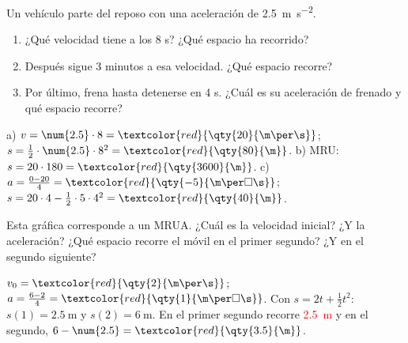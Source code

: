 \begin{exercise}
    Un vehículo parte del reposo con una aceleración de \qty{2.5}{\m\per\square\s}.
    \begin{enumerate}[label=\alph*)]
        \item ¿Qué velocidad tiene a los 8 s? ¿Qué espacio ha recorrido?
        \item Después sigue 3 minutos a esa velocidad. ¿Qué espacio recorre?
        \item Por último, frena hasta detenerse en 4 s. ¿Cuál es su aceleración de frenado y qué espacio recorre?
    \end{enumerate}
    \begin{solu}
        a) \(v = \num{2.5} \cdot 8 = \textcolor{red}{\qty{20}{\m\per\s}}\); \(s = \frac{1}{2} \cdot \num{2.5} \cdot 8^2 = \textcolor{red}{\qty{80}{\m}}\).
        b) MRU: \(s = 20 \cdot 180 = \textcolor{red}{\qty{3600}{\m}}\).
        c) \(a = \frac{0 - 20}{4} = \textcolor{red}{\qty{-5}{\m\per\square\s}}\); \(s = 20 \cdot 4 - \frac{1}{2} \cdot 5 \cdot 4^2 = \textcolor{red}{\qty{40}{\m}}\).
    \end{solu}
\end{exercise}

\begin{exercise}
    Esta gráfica corresponde a un MRUA. ¿Cuál es la velocidad inicial? ¿Y la aceleración? ¿Qué espacio recorre el móvil en el primer segundo? ¿Y en el segundo siguiente?
    \begin{center}
    \end{center}
    \begin{solu}
        \(v_0 = \textcolor{red}{\qty{2}{\m\per\s}}\); \(a = \frac{6 - 2}{4} = \textcolor{red}{\qty{1}{\m\per\square\s}}\). Con \(s = 2t + \frac{1}{2}t^2\): \(s(1) = \qty{2.5}{\m}\) y \(s(2) = \qty{6}{\m}\). En el primer segundo recorre \textcolor{red}{\qty{2.5}{\m}} y en el segundo, \(6 - \num{2.5} = \textcolor{red}{\qty{3.5}{\m}}\).
    \end{solu}
\end{exercise}

